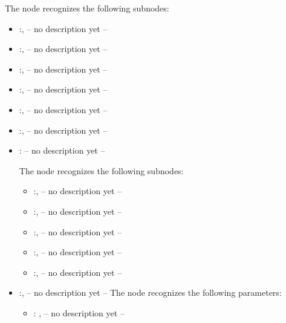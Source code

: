   The  node recognizes the following subnodes:
  \begin{itemize}
    \item {}:, 
      -- no description yet --

    \item {}:, 
      -- no description yet --

    \item {}:, 
      -- no description yet --

    \item {}:, 
      -- no description yet --

    \item {}:, 
      -- no description yet --

    \item {}:, 
      -- no description yet --

    \item {}:
      -- no description yet --

      The  node recognizes the following subnodes:
      \begin{itemize}
        \item {}:, 
          -- no description yet --

        \item {}:, 
          -- no description yet --

        \item {}:, 
          -- no description yet --

        \item {}:, 
          -- no description yet --

        \item {}:, 
          -- no description yet --
      \end{itemize}

    \item {}:, 
      -- no description yet --
      The  node recognizes the following parameters:
        \begin{itemize}
          \item {}: , 
            -- no description yet --
      \end{itemize}
  \end{itemize}
